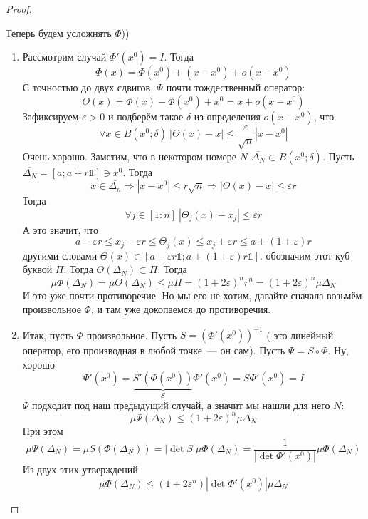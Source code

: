 \documentclass{article}
\let\eps\varepsilon
\begin{document}
\begin{proof}
\begin{enumerate}
            Теперь будем усложнять $\Phi$))
            \begin{enumerate}
                \item Рассмотрим случай $\Phi'(x^0)=I$. Тогда
                $$
                \Phi(x)=\Phi(x^0)+(x-x^0)+o(x-x^0)
                $$
                С точностью до двух сдвигов, $\Phi$ почти тождественный оператор:
                $$
                \Theta(x)=\Phi(x)-\Phi(x^0)+x^0=x+o(x-x^0)
                $$
                Зафиксируем $\eps>0$ и подберём такое $\delta$ из определения $o(x-x^0)$, что
                $$
                \forall x\in B(x^0;\delta)~|\Theta(x)-x|\leqslant\frac{\eps}{\sqrt n}|x-x^0|
                $$
                Очень хорошо. Заметим, что в некотором номере $N$ $\overline{\Delta_{N}}\subset B(x^0;\delta)$. Пусть $\overline{\Delta_{N}}=[a;a+r\mathbb1]\ni x^0$. Тогда
                $$
                x\in\overline{\Delta_n}\Rightarrow|x-x^0|\leqslant r\sqrt n\Rightarrow |\Theta(x)-x|\leqslant\eps r
                $$
                Тогда
                $$
                \forall j\in[1:n]~|\Theta_j(x)-x_j|\leqslant\eps r
                $$
                А это значит, что
                $$a-\eps r\leqslant x_j-\eps r\leqslant\Theta_j(x)\leqslant x_j+\eps r\leqslant a+(1+\eps)r$$
                другими словами $\Theta(x)\in[a-\eps r\mathbb1;a+(1+\eps)r\mathbb1]$. обозначим этот куб буквой $\Pi$. Тогда $\Theta(\Delta_N)\subset\Pi$. Тогда
                $$
                \mu\Phi(\Delta_N)=\mu\Theta(\Delta_N)\leqslant\mu\Pi=(1+2\eps)^nr^n=(1+2\eps)^n\mu\Delta_N
                $$
                И это уже почти противоречие. Но мы его не хотим, давайте сначала возьмём произвольное $\Phi$, и там уже докопаемся до противоречия.
                \item Итак, пусть $\Phi$ произвольное. Пусть $S=(\Phi'(x^0))^{-1}$ ({\color{red} это линейный оператор}, его производная в любой точке~--- он сам). Пусть $\Psi=S\circ\Phi$. Ну, хорошо
                $$
                \Psi'(x^0)=\underbrace{S'(\Phi(x^0))}_S\Phi'(x^0)=S\Phi'(x^0)=I
                $$
                $\Psi$ подходит под наш предыдущий случай, а значит мы нашли для него $N$:
                $$
                \mu\Psi(\Delta_N)\leqslant(1+2\eps)^n\mu\Delta_N
                $$
                При этом
                $$
                \mu\Psi(\Delta_N)=\mu S(\Phi(\Delta_N))=|\det S|\mu \Phi(\Delta_N)=\frac1{|\det\Phi'(x^0)|}\mu\Phi(\Delta_N)
                $$
                Из двух этих утверждений
                $$
                \mu\Phi(\Delta_N)\leqslant(1+2\eps^n)|\det\Phi'(x^0)|\mu\Delta_N
$$
\end{enumerate}
\end{enumerate}
\end{proof}
\end{document}
